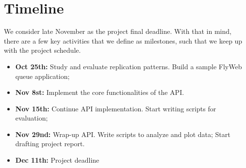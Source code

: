 \section{Timeline}
\label{sec:timeline}

We consider late November as the project final deadline. With that in mind, there are a few key activities that we define as milestones, such that we keep up with the project schedule.

\begin{itemize}
    \item {\bf Oct 25th: } Study and evaluate replication patterns. Build a sample FlyWeb queue application;
    \item {\bf Nov 8st: } Implement the core functionalities of the \APIName{} API.
    \item {\bf Nov 15th: } Continue API implementation. Start writing scripts for evaluation;
    \item {\bf Nov 29nd: } Wrap-up API. Write scripts to analyze and plot data; Start drafting project report.
    \item {\bf Dec 11th: } Project deadline
\end{itemize}
